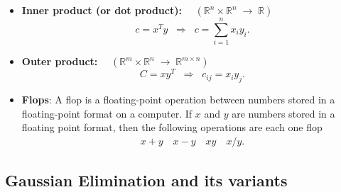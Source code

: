 \documentclass{report}
\begin{document}
\begin{itemize}
        \item \textbf{Inner product (or dot product): } $\quad (\mathbb{R}^n \times \mathbb{R}^n \;\to\; \mathbb{R})$
            \[
                c = x^T y 
                \;\;\Longrightarrow\;\; 
                c = \sum_{i=1}^{n} x_i y_i.
            \]

            \item \textbf{Outer product: } $\quad (\mathbb{R}^m \times \mathbb{R}^n \;\to\; \mathbb{R}^{m \times n})$
            \[
                C = x y^T 
                \;\;\Longrightarrow\;\; 
                c_{ij} = x_i y_j.
            \]
        \item \textbf{Flops}: A flop is a floating-point operation between numbers stored in a floating-point format on a computer.
            \bigbreak \noindent 
            If $x$ and $y$ are numbers stored in a floating point format, then the following operations are each one flop
            \begin{align*}
                x + y \quad x - y \quad xy \quad x / y
            .\end{align*}







    \end{itemize}



    \pagebreak \bigbreak \noindent 
    \subsection{Gaussian Elimination and its variants}
    \bigbreak \noindent 
\end{document}
